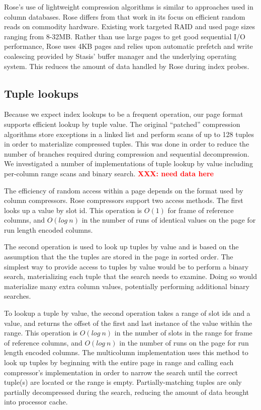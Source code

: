 \documentclass{vldb}
\newcommand{\rows}{Rose\xspace}
\newcommand{\rowss}{Rose's\xspace}
\newcommand{\xxx}[1]{\textcolor{red}{\bf XXX: #1}}
\begin{document}
\rowss use of lightweight compression algorithms is similar to
approaches used in column databases\cite{pfor}.  \rows differs from
that work in its focus on efficient random reads on commodity
hardware.  Existing work targeted RAID and used page sizes ranging from 8-32MB.  Rather
than use large pages to get good sequential I/O performance, \rows
uses 4KB pages and relies upon automatic prefetch and write coalescing
provided by Stasis' buffer manager and the underlying operating
system.  This reduces the amount of data handled by \rows during index
probes.

\subsection{Tuple lookups}

Because we expect index lookups to be a frequent operation, our
page format supports efficient lookup by tuple value.  The original
``patched'' compression algorithms store exceptions in a linked list
and perform scans of up to 128 tuples in order to materialize compressed
tuples.  This was done in order to reduce the number of branches
required during compression and sequential decompression.  We
investigated a number of implementations of tuple lookup by value
including per-column range scans and binary search.  \xxx{need data here}

The efficiency of random access within a
page depends on the format used by column compressors.  \rows
compressors support two access methods.  The first looks up a value by
slot id.  This operation is $O(1)$ for frame of reference columns, and
$O(log~n)$ in the number of runs of identical values on the page for
run length encoded columns.

The second operation is used to look up tuples by value and is based
on the assumption that the the tuples are stored in the
page in sorted order.  The simplest way to provide access to tuples by
value would be to perform a binary search, materializing each tuple
that the search needs to examine.  Doing so would materialize many
extra column values, potentially performing additional binary searches.

To lookup a tuple by value, the second operation takes a range of slot
ids and a value, and returns the offset of the first and last instance
of the value within the range.  This operation is $O(log~n)$ in the
number of slots in the range for frame of reference columns, and
$O(log~n)$ in the number of runs on the page for run length encoded
columns.  The multicolumn implementation uses this method to look up
tuples by beginning with the entire page in range and calling each
compressor's implementation in order to narrow the search until the
correct tuple(s) are located or the range is empty.
Partially-matching tuples are only partially decompressed during the
search, reducing the amount of data brought into processor cache.
\end{document}
